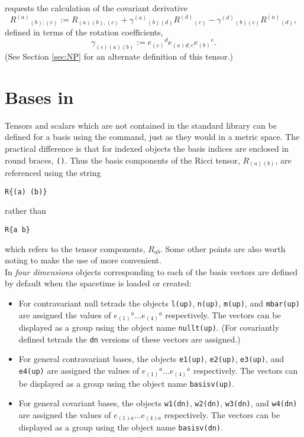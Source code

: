 \documentclass{article}
\begin{document}
\noindent requests the calculation of the covariant derivative
\[
  R^{(a)}{}_{(b);(c)} := R_{(a)(b),(c)} + \gamma^{(a)}{}_{(b)(d)}
  R^{(d)}{}_{(c)} - \gamma^{(d)}{}_{(b)(c)} R^{(a)}{}_{(d)},
\]
defined in terms of the rotation coefficients,
\[
  \gamma_{(c)(a)(b)} := e_{(c)}{}^d e_{(a)d;e} e_{(b)}{}^e.
\]
(See Section \ref{sec:NP} for an alternate definition of this tensor.)
%
\section{Bases in }\label{sec:def}
%
Tensors and scalars which are not contained in the standard library
can be defined for a basis using the  command, just as
they would in a metric space. The practical difference is that for
indexed objects the basis indices are enclosed in round braces,
\texttt{()}. Thus the basis components of the Ricci tensor,
$R_{(a)(b)}$, are referenced using the string
\begin{center}
  \texttt{R\{(a) (b)\}}\\
\end{center}
rather than
\begin{center}
  \texttt{R\{a b\}}\\
\end{center}
which refers to the tensor components, $R_{ab}$. Some other points are
also worth noting to make the use of  more convenient.\\

In \textit{four dimensions} objects corresponding to each of the basis
vectors are defined by default when the spacetime is loaded or
created:
\begin{itemize}
  \item For contravariant null tetrads the objects \texttt{l(up)},
    \texttt{n(up)}, \texttt{m(up)}, and \texttt{mbar(up)} are assigned
    the values of $e_{(1)}{}^a \ldots e_{(4)}{}^a$ respectively. The
    vectors can be displayed as a group using the object name
    \texttt{nullt(up)}.  (For covariantly defined tetrads the \texttt{dn}
    versions of these vectors are assigned.)
  \item For general contravariant bases, the objects \texttt{e1(up)},
    \texttt{e2(up)}, \texttt{e3(up)}, and \texttt{e4(up)} are assigned
    the values of $e_{(1)}{}^a \ldots e_{(4)}{}^a$ respectively.  The
    vectors can be displayed as a group using the object name
    \texttt{basisv(up)}.
  \item For general covariant bases, the objects \texttt{w1(dn)},
    \texttt{w2(dn)}, \texttt{w3(dn)}, and \texttt{w4(dn)} are assigned
    the values of $e_{(1)a} \ldots e_{(4)a}$ respectively. The
    vectors can be displayed as a group using the object name
    \texttt{basisv(dn)}.
\end{itemize}
\end{document}
